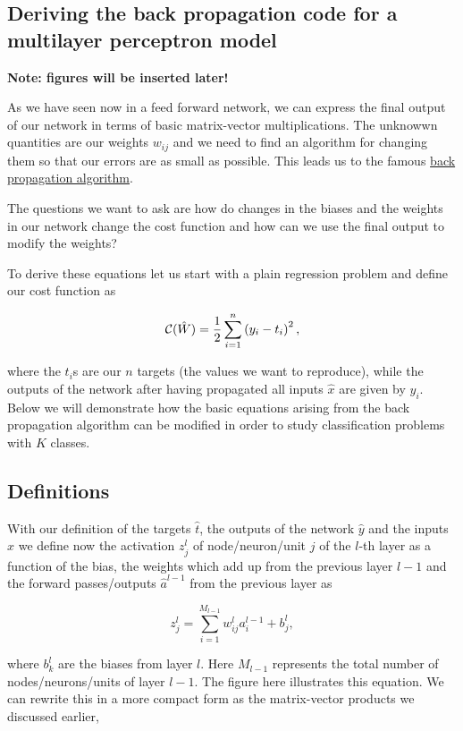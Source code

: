 \documentclass[%
oneside,                 %
final,                   %
10pt]{article}
\begin{document}
\subsection{Deriving the back propagation code for a multilayer perceptron model}


\textbf{Note: figures will be inserted later!}

As we have seen now in a feed forward network, we can express the final output of our network in terms of basic matrix-vector multiplications.
The unknowwn quantities are our weights $w_{ij}$ and we need to find an algorithm for changing them so that our errors are as small as possible.
This leads us to the famous \href{{https://www.nature.com/articles/323533a0}}{back propagation algorithm}.

The questions we want to ask are how do changes in the biases and the
weights in our network change the cost function and how can we use the
final output to modify the weights?

To derive these equations let us start with a plain regression problem
and define our cost function as

\[
{\cal C}(\hat{W})  =  \frac{1}{2}\sum_{i=1}^n\left(y_i - t_i\right)^2, 
\]

where the $t_i$s are our $n$ targets (the values we want to
reproduce), while the outputs of the network after having propagated
all inputs $\hat{x}$ are given by $y_i$.  Below we will demonstrate
how the basic equations arising from the back propagation algorithm
can be modified in order to study classification problems with $K$
classes.

\subsection{Definitions}

With our definition of the targets $\hat{t}$, the outputs of the
network $\hat{y}$ and the inputs $\hat{x}$ we
define now the activation $z_j^l$ of node/neuron/unit $j$ of the
$l$-th layer as a function of the bias, the weights which add up from
the previous layer $l-1$ and the forward passes/outputs
$\hat{a}^{l-1}$ from the previous layer as


\[
z_j^l = \sum_{i=1}^{M_{l-1}}w_{ij}^la_i^{l-1}+b_j^l,
\]

where $b_k^l$ are the biases from layer $l$.  Here $M_{l-1}$
represents the total number of nodes/neurons/units of layer $l-1$. The
figure here illustrates this equation.  We can rewrite this in a more
compact form as the matrix-vector products we discussed earlier,
\end{document}

